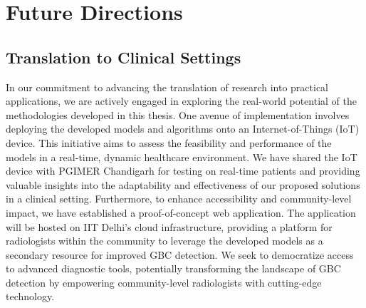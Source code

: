 \section{Future Directions}

\subsection{Translation to Clinical Settings}
%
In our commitment to advancing the translation of research into practical applications, we are actively engaged in exploring the real-world potential of the methodologies developed in this thesis. One avenue of implementation involves deploying the developed models and algorithms onto an Internet-of-Things (IoT) device. This initiative aims to assess the feasibility and performance of the models in a real-time, dynamic healthcare environment. We have shared the IoT device with PGIMER Chandigarh for testing on real-time patients and providing valuable insights into the adaptability and effectiveness of our proposed solutions in a clinical setting. Furthermore, to enhance accessibility and community-level impact, we have established a proof-of-concept web application. The application will be hosted on IIT Delhi's cloud infrastructure, providing a platform for radiologists within the community to leverage the developed models as a secondary resource for improved GBC detection. We seek to democratize access to advanced diagnostic tools, potentially transforming the landscape of GBC detection by empowering community-level radiologists with cutting-edge technology. %


